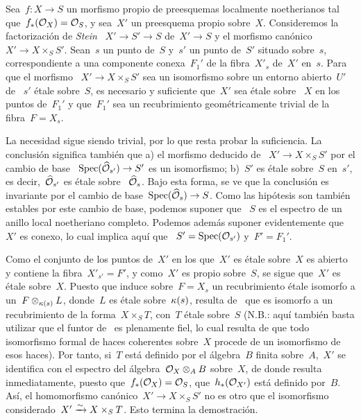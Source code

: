 \begin{corollaire}
\label{IX.6.6}
Sea~$f\colon X\to S$ un morfismo propio de preesquemas localmente
noetherianos tal que~$f_*(\cal{O}_X)=\cal{O}_S$, y sea~$X'$ un preesquema
propio sobre~$X$. Consideremos la factorización de \emph{Stein}
~$X'\to S'\to S$ de~$X'\to S$ y el morfismo canónico
~$X'\to X\times_S S'$. Sean~$s$ un punto de~$S$ y~$s'$ un punto de~$S'$
situado sobre~$s$, correspondiente a una componente conexa~$F_1'$ de la
fibra~$X'_s$ de~$X'$ en~$s$. Para que el morfismo
~$X'\to X\times_S S'$ sea un isomorfismo sobre un entorno abierto~$U'$ de
~$s'$ étale sobre~$S$, es necesario y suficiente que~$X'$ sea étale sobre
~$X$ en los puntos de~$F_1'$ y que~$F_1'$ sea un recubrimiento
geométricamente trivial de la fibra~$F=X_s$.
\end{corollaire}

La necesidad sigue siendo trivial, por lo que resta probar la suficiencia.
La conclusión significa también que a) el morfismo deducido de
~$X'\to X\times_S S'$ por el cambio de base
~$\Spec(\widehat{\cal{O}}_{s'})\to S'$ es un isomorfismo; b)~$S'$ es étale
sobre~$S$ en~$s'$, es decir,~$\widehat{\cal{O}}_{s'}$ es étale sobre
~$\widehat{\cal{O}}_s$. Bajo esta forma, se ve que la conclusión es
invariante por el cambio de base~$\Spec(\widehat{\cal{O}}_s)\to S$. Como las
hipótesis son también estables por este cambio de base, podemos suponer que
~$S$ es el espectro de un anillo local noetheriano completo. Podemos además
suponer evidentemente que~$X'$ es conexo, lo cual implica aquí que
~$S'=\Spec(\cal{O}_{s'})$ y~$F'=F_1'$.

Como
el conjunto de los puntos de~$X'$ en los que~$X'$ es étale sobre~$X$ es
abierto y contiene la fibra~$X'_{s'}=F'$, y como~$X'$ es propio sobre~$S$, se
sigue que~$X'$ es étale sobre~$X$. Puesto que induce sobre~$F=X_s$ un
recubrimiento étale isomorfo a un~$F\otimes_{\kres(s)}L$, donde~$L$ es étale
sobre~$\kres(s)$, resulta de~ que es isomorfo a un
recubrimiento de la forma~$X\times_S T$, con~$T$ étale sobre~$S$ (N.B.: aquí
también basta utilizar que el funtor de~ es plenamente fiel,
lo cual resulta de que todo isomorfismo formal de haces coherentes sobre~$X$
procede de un isomorfismo de esos haces). Por tanto, si~$T$ está definido por
el álgebra~$B$ finita sobre~$A$,~$X'$ se identifica con el espectro del
álgebra~$\cal{O}_X\otimes_A B$ sobre~$X$, de donde resulta inmediatamente,
puesto que~$f_*(\cal{O}_X)=\cal{O}_S$, que~$h_*(\cal{O}_{X'})$ está definido
por~$B$. Así, el homomorfismo canónico~$X'\to X\times_S S'$ no es otro que el
isomorfismo considerado~$X'\isomto X\times_S T$. Esto termina la
demostración.

